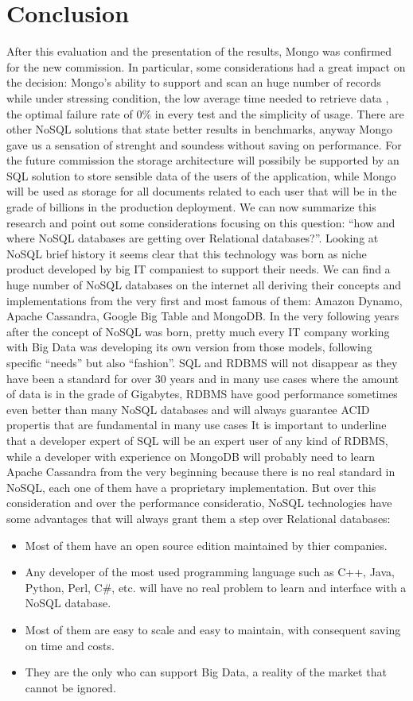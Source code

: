 \chapter{Conclusion}
\label{cha:conclusion}
After this evaluation and the presentation of the results, Mongo was confirmed for the new commission. In particular, some considerations had a great impact on the decision: Mongo's ability to support and scan an huge number of records while under stressing condition, the low average time needed to retrieve data , the optimal failure rate of 0\% in every test and the simplicity of usage.
There are other NoSQL solutions that state better results in benchmarks, anyway Mongo gave us a sensation of strenght and soundess without saving on performance.
For the future commission the storage architecture will possibily be supported by an SQL solution to store sensible data of the users of the application, while Mongo will be used as storage for all documents related to each user that will be in the grade of billions in the production deployment.
We can now summarize this research and point out some considerations focusing on this question: “how and where NoSQL databases are getting over Relational databases?”.
Looking at NoSQL brief history it seems clear that this technology was born as niche product developed by big IT companiest to support their needs. We can find a huge number of NoSQL databases on the internet all deriving their concepts and implementations from the very first and most famous of them: Amazon Dynamo, Apache Cassandra, Google Big Table and MongoDB.
In the very following years after the concept of NoSQL was born, pretty much every IT company working with Big Data was developing its own version from those models, following specific “needs” but also “fashion”.
SQL and RDBMS will not disappear as they have been a standard for over 30 years and in many use cases where the amount of data is in the grade of Gigabytes, RDBMS  have good performance sometimes even better than many NoSQL databases and will always guarantee ACID propertis that are fundamental in many use cases
It is important to underline that a developer expert of SQL will be an expert user of any kind of RDBMS, while a developer with experience on MongoDB will probably need to learn Apache Cassandra from the very beginning because there is no real standard in NoSQL, each one of them have a proprietary implementation.
But over this consideration and over the performance consideratio, NoSQL technologies have some advantages that will always grant them a step over Relational databases:
\begin{itemize}
	\item Most of them have an open source edition maintained by thier companies.
	\item Any developer of the most used programming language such as C++, Java, Python, Perl, C\#, etc. will have no real problem to learn and interface with a NoSQL database.
	\item Most of them are easy to scale and easy to maintain, with consequent saving on time and costs.
	\item They are the only who can support Big Data, a reality of the market that cannot be ignored.
\end{itemize}
